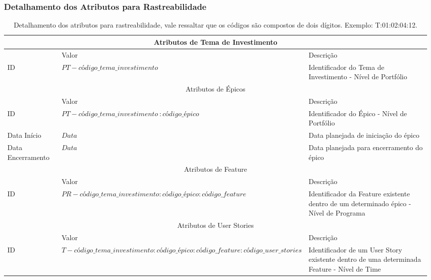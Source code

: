 			\subsubsection[Detalhamento dos Atributos para Rastreabilidade]{Detalhamento dos Atributos para Rastreabilidade}
			\label{subsubsec:tgr_rastreabilidade_detalhe}
				\begin{table}[h]
					\centering
					\begin{tabular}{|p{2cm}|p{7cm}|p{3cm}|}
						\hline
						\multicolumn{3}{|c|}{Atributos de Tema de Investimento} \\
						\hline
						& Valor & Descrição \\ \hline
						ID & $PT - código\_ tema\_investimento $ & Identificador do Tema de Investimento - Nível de Portfólio \\ \hline
						\hline
						\multicolumn{3}{|c|}{Atributos de Épicos} \\
						\hline
						& Valor & Descrição \\ \hline
						ID & $PT - código\_tema\_investimento\ : código\_épico $ & Identificador do Épico - Nível de Portfólio \\ \hline
						Data Início & $Data$ & Data planejada de iniciação do épico \\ \hline
						Data Encerramento & $Data$ & Data planejada para encerramento do épico \\ \hline
						\hline
						\multicolumn{3}{|c|}{Atributos de Feature} \\
						\hline
						& Valor & Descrição \\ \hline
						ID & $PR - código\_tema\_investimento : código\_épico : código\_feature$ & Identificador da Feature existente dentro de um determinado épico - Nível de Programa \\ \hline
						\hline
						\multicolumn{3}{|c|}{Atributos de User Stories} \\
						\hline
						& Valor & Descrição \\ \hline
						ID & $T - código\_tema\_investimento : código\_épico : código\_feature : código\_user\_stories$ & Identificador de um User Story existente dentro de uma determinada Feature - Nível de Time \\ \hline
					\end{tabular}
					\caption[Detalhamento dos Atributos para Rastreabilidade]{Detalhamento dos atributos para rastreabilidade, vale ressaltar que os códigos são compostos de dois dígitos. Exemplo: T:01:02:04:12.}
					\label{tab:atributo_rastreabilidade}
				\end{table}

